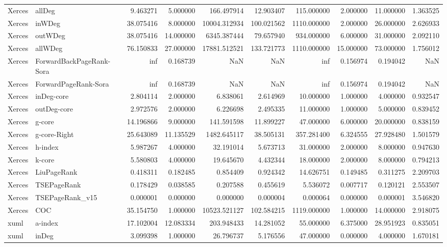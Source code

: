 \begin{tabular}{llrrrrrrrr}
Xerces & allDeg & 9.463271 & 5.000000 & 166.497914 & 12.903407 & 115.000000 & 2.000000 & 11.000000 & 1.363525 \\
Xerces & inWDeg & 38.075416 & 8.000000 & 10004.312934 & 100.021562 & 1110.000000 & 2.000000 & 26.000000 & 2.626933 \\
Xerces & outWDeg & 38.075416 & 14.000000 & 6345.387444 & 79.657940 & 934.000000 & 6.000000 & 31.000000 & 2.092110 \\
Xerces & allWDeg & 76.150833 & 27.000000 & 17881.512521 & 133.721773 & 1110.000000 & 15.000000 & 73.000000 & 1.756012 \\
Xerces & ForwardBackPageRank-Sora & inf & 0.168739 & NaN & NaN & inf & 0.156974 & 0.194042 & NaN \\
Xerces & ForwardPageRank-Sora & inf & 0.168739 & NaN & NaN & inf & 0.156974 & 0.194042 & NaN \\
Xerces & inDeg-core & 2.804114 & 2.000000 & 6.838061 & 2.614969 & 10.000000 & 1.000000 & 4.000000 & 0.932547 \\
Xerces & outDeg-core & 2.972576 & 2.000000 & 6.226698 & 2.495335 & 11.000000 & 1.000000 & 5.000000 & 0.839452 \\
Xerces & g-core & 14.196866 & 9.000000 & 141.591598 & 11.899227 & 47.000000 & 6.000000 & 20.000000 & 0.838159 \\
Xerces & g-core-Right & 25.643089 & 11.135529 & 1482.645117 & 38.505131 & 357.281400 & 6.324555 & 27.928480 & 1.501579 \\
Xerces & h-index & 5.987267 & 4.000000 & 32.191014 & 5.673713 & 31.000000 & 2.000000 & 8.000000 & 0.947630 \\
Xerces & k-core & 5.580803 & 4.000000 & 19.645670 & 4.432344 & 18.000000 & 2.000000 & 8.000000 & 0.794213 \\
Xerces & LiuPageRank & 0.418311 & 0.182485 & 0.854409 & 0.924342 & 14.626751 & 0.149485 & 0.311275 & 2.209703 \\
Xerces & TSEPageRank & 0.178429 & 0.038585 & 0.207588 & 0.455619 & 5.536072 & 0.007717 & 0.120121 & 2.553507 \\
Xerces & TSEPageRank_v15 & 0.000001 & 0.000000 & 0.000000 & 0.000004 & 0.000064 & 0.000000 & 0.000001 & 3.546820 \\
Xerces & COC & 35.154750 & 1.000000 & 10523.521127 & 102.584215 & 1119.000000 & 1.000000 & 14.000000 & 2.918075 \\
xuml & a-index & 17.102004 & 12.083334 & 203.948433 & 14.281052 & 55.000000 & 6.375000 & 28.951923 & 0.835051 \\
xuml & inDeg & 3.099398 & 1.000000 & 26.796737 & 5.176556 & 47.000000 & 0.000000 & 4.000000 & 1.670181 \\

\end{tabular}

